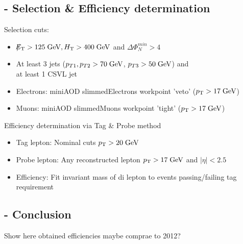 \documentclass{beamer}
\begin{document}
\subsection{\Zll - Selection \& Efficiency determination}
\begin{frame}
Selection cuts:
\begin{itemize}
 \item $\slash\mkern-12mu{E}_{\text{T}} > 125 \;\text{Ge}\kern-0.06667em\text{V}, H_{\text{T}} > 400 \;\text{Ge}\kern-0.06667em\text{V} $ and $\Delta\Phi_{N}^{min}>4$
 \item At least 3 jets ($p_{T\text{1}},p_{T\text{2}} > 70\;\text{Ge}\kern-0.06667em\text{V}$, $p_{T\text{3}} > 50\;\text{Ge}\kern-0.06667em\text{V}$) and \\ at least 1 CSVL jet
 \item Electrons: miniAOD slimmedElectrons workpoint 'veto' ($p_{\text{T}}>17\;\text{Ge}\kern-0.06667em\text{V}$)
 \item Muons: miniAOD slimmedMuons workpoint 'tight' ($p_{\text{T}}>17\;\text{Ge}\kern-0.06667em\text{V}$)
\end{itemize}
Efficiency determination via Tag \& Probe method
\begin{itemize}
 \item Tag lepton: Nominal cuts $p_{\text{T}}>20\;\text{Ge}\kern-0.06667em\text{V}$
 \item Probe lepton: Any reconstructed lepton $p_{\text{T}}>17\;\text{Ge}\kern-0.06667em\text{V}$ and $|\eta|<2.5$
 \item Efficiency: Fit invariant mass of di lepton to events passing/failing tag requirement 
\end{itemize}
\end{frame}

\subsection{\Zll - Conclusion}
\begin{frame}
Show here obtained efficiencies maybe comprae to 2012?
\end{frame}

\end{document}
